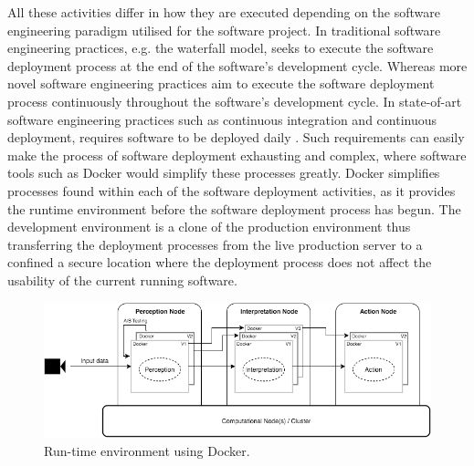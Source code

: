 All these activities differ in how they are executed depending on the software engineering paradigm utilised for the software project. In traditional software engineering practices, e.g. the waterfall model, seeks to execute the software deployment process at the end of the software's development cycle. Whereas more novel software engineering practices aim to execute the software deployment process continuously throughout the software's development cycle. In state-of-art software engineering practices such as continuous integration and continuous deployment, requires software to be deployed daily \cite{meyer2014continuous}. Such requirements can easily make the process of software deployment exhausting and complex, where software tools such as Docker would simplify these processes greatly. Docker simplifies processes found within each of the software deployment activities, as it provides the runtime environment before the software deployment process has begun. The development environment is a clone of the production environment thus transferring the deployment processes from the live production server to a confined a secure location where the deployment process does not affect the usability of the current running software.\\


\begin{figure}[ht]
\centering
     \includegraphics[width=1.0\textwidth]{./figure/containers.png}
      \caption{Run-time environment using Docker.}
       \label{containers}
\end{figure}

